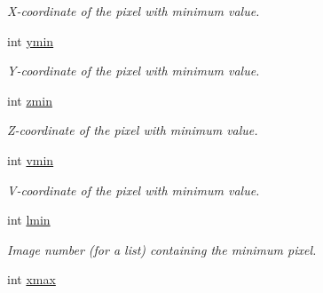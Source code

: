 \begin{DoxyCompactItemize}
\begin{DoxyCompactList}\small\item\em X-\/coordinate of the pixel with minimum value. \item\end{DoxyCompactList}\item 
\hypertarget{structcimg__library_1_1_c_img_stats_aac1ca515a4699cd326bc25bff0b332ce}{
int \hyperlink{structcimg__library_1_1_c_img_stats_aac1ca515a4699cd326bc25bff0b332ce}{ymin}}
\label{structcimg__library_1_1_c_img_stats_aac1ca515a4699cd326bc25bff0b332ce}

\begin{DoxyCompactList}\small\item\em Y-\/coordinate of the pixel with minimum value. \item\end{DoxyCompactList}\item 
\hypertarget{structcimg__library_1_1_c_img_stats_a7218b7bffd90b87182bd774e6c1b1020}{
int \hyperlink{structcimg__library_1_1_c_img_stats_a7218b7bffd90b87182bd774e6c1b1020}{zmin}}
\label{structcimg__library_1_1_c_img_stats_a7218b7bffd90b87182bd774e6c1b1020}

\begin{DoxyCompactList}\small\item\em Z-\/coordinate of the pixel with minimum value. \item\end{DoxyCompactList}\item 
\hypertarget{structcimg__library_1_1_c_img_stats_a911364d1c5e7112a71e56ba5877ed067}{
int \hyperlink{structcimg__library_1_1_c_img_stats_a911364d1c5e7112a71e56ba5877ed067}{vmin}}
\label{structcimg__library_1_1_c_img_stats_a911364d1c5e7112a71e56ba5877ed067}

\begin{DoxyCompactList}\small\item\em V-\/coordinate of the pixel with minimum value. \item\end{DoxyCompactList}\item 
\hypertarget{structcimg__library_1_1_c_img_stats_aaf4eb227b28ce91da53d8399174a6de8}{
int \hyperlink{structcimg__library_1_1_c_img_stats_aaf4eb227b28ce91da53d8399174a6de8}{lmin}}
\label{structcimg__library_1_1_c_img_stats_aaf4eb227b28ce91da53d8399174a6de8}

\begin{DoxyCompactList}\small\item\em Image number (for a list) containing the minimum pixel. \item\end{DoxyCompactList}\item 
\hypertarget{structcimg__library_1_1_c_img_stats_a4da83f0f56ebb3992c46d49b271b15ce}{
int \hyperlink{structcimg__library_1_1_c_img_stats_a4da83f0f56ebb3992c46d49b271b15ce}{xmax}}
\label{structcimg__library_1_1_c_img_stats_a4da83f0f56ebb3992c46d49b271b15ce}


\end{DoxyCompactItemize}
